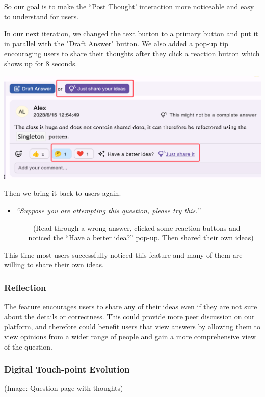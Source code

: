 \documentclass[a4paper]{article}
\begin{document}
    So our goal is to make the ``Post Thought' interaction more noticeable and easy to understand for users.

    In our next iteration, we changed the text button to a primary button and put it in parallel with the "Draft Answer" button.
    We also added a pop-up tip encouraging users to share their thoughts after they click a reaction button which shows up for 8 seconds.

    \noindent \includegraphics[width=\textwidth]{thought2}

    \noindent Then we bring it back to users again.

    \begin{itemize}
        \item \textit{``Suppose you are attempting this question, please try this.''}
        \begin{itemize}
            \item[-] (Read through a wrong answer, clicked some reaction buttons and noticed the ``Have a better idea?'' pop-up. Then shared their own ideas)
        \end{itemize}
    \end{itemize}

    This time most users successfully noticed this feature and many of them are willing to share their own ideas.

    \subsubsection*{Reflection}

    The feature encourages users to share any of their ideas even if they are not sure about the details or correctness.
    This could provide more peer discussion on our platform, and therefore could benefit users that view answers
    by allowing them to view opinions from a wider range of people and gain a more comprehensive view of the question.

    \subsubsection*{Digital Touch-point Evolution}
    \noindent (Image: Question page with thoughts)
\end{document}
